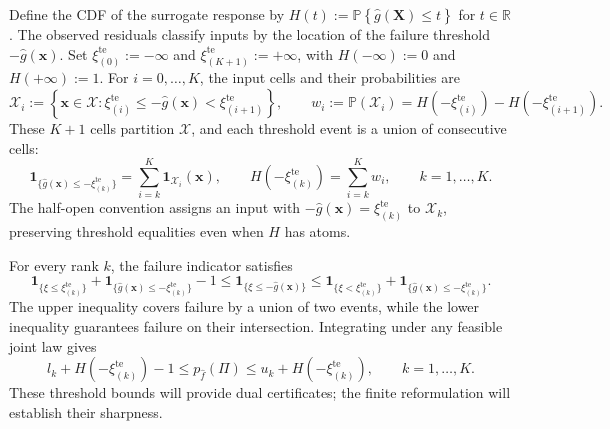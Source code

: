 \documentclass[review,11pt,3p,authoryear,nopreprintline]{elsarticle}
\begin{document}
Define the CDF of the surrogate response by $H(t):=\mathbb P\left\{\hat g(\bm X)\le t\right\}$ for $t\in\mathbb R$. The observed residuals classify inputs by the location of the failure threshold $-\hat g(\bm x)$. Set $\xi_{(0)}^{\mathrm{te}}:=-\infty$ and $\xi_{(K+1)}^{\mathrm{te}}:=+\infty$, with $H(-\infty):=0$ and $H(+\infty):=1$. For $i=0,\ldots,K$, the input cells and their probabilities are
\begin{equation}
  \mathcal X_i:=\left\{\bm x\in\mathcal X:
    \xi_{(i)}^{\mathrm{te}}\le-\hat g(\bm x)<\xi_{(i+1)}^{\mathrm{te}}\right\},
  \qquad
  w_i:=\mathbb P(\mathcal X_i)
    =H\left(-\xi_{(i)}^{\mathrm{te}}\right)-H\left(-\xi_{(i+1)}^{\mathrm{te}}\right).
  \label{eq-input-cells}
\end{equation}
These $K+1$ cells partition $\mathcal X$, and each threshold event is a union of consecutive cells:
\[
  \mathbf1_{\{\hat g(\bm x)\le-\xi_{(k)}^{\mathrm{te}}\}}
    =\sum_{i=k}^K\mathbf1_{\mathcal X_i}(\bm x),
  \qquad
  H\left(-\xi_{(k)}^{\mathrm{te}}\right)=\sum_{i=k}^K w_i,
  \qquad k=1,\ldots,K.
\]
The half-open convention assigns an input with $-\hat g(\bm x)=\xi_{(k)}^{\mathrm{te}}$ to $\mathcal X_k$, preserving threshold equalities even when $H$ has atoms.

For every rank $k$, the failure indicator satisfies 
\[
  \mathbf1_{\{\xi\le\xi_{(k)}^{\mathrm{te}}\}}
    +\mathbf1_{\{\hat g(\bm x)\le-\xi_{(k)}^{\mathrm{te}}\}}-1
  \le\mathbf1_{\{\xi\le-\hat g(\bm x)\}}
  \le\mathbf1_{\{\xi<\xi_{(k)}^{\mathrm{te}}\}}
    +\mathbf1_{\{\hat g(\bm x)\le-\xi_{(k)}^{\mathrm{te}}\}}.
\]
The upper inequality covers failure by a union of two events, while the lower inequality guarantees failure on their intersection. Integrating under any feasible joint law gives
\begin{equation*}
  l_k+H\left(-\xi_{(k)}^{\mathrm{te}}\right)-1\le p_{\hat f}(\Pi)\le u_k+H\left(-\xi_{(k)}^{\mathrm{te}}\right),
  \qquad k=1,\ldots,K.
\end{equation*}
These threshold bounds will provide dual certificates; the finite reformulation will establish their sharpness.
\end{document}
